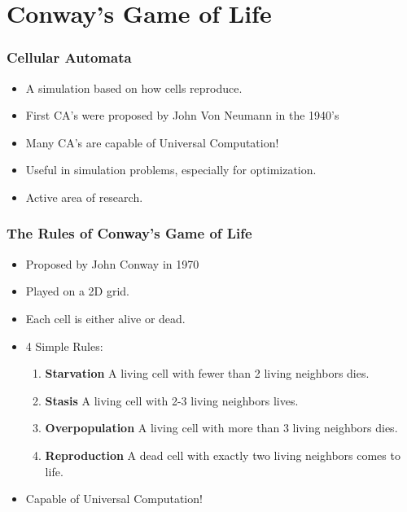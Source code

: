 \documentclass{beamer}
\begin{document}
\section{Conway's Game of Life}
\begin{frame}
    \frametitle{Cellular Automata}
    \begin{itemize}
        \item A simulation based on how cells reproduce.
        \item First CA's were proposed by John Von Neumann in the 1940's
        \item Many CA's are capable of Universal Computation!
        \item Useful in simulation problems, especially for optimization.
        \item Active area of research.
    \end{itemize}
\end{frame}

\begin{frame}
    \frametitle{The Rules of Conway's Game of Life}
    \begin{itemize}
    \item Proposed by John Conway in 1970
    \item Played on a 2D grid. 
    \item Each cell is either alive or dead.
    \item 4 Simple Rules:
    \begin{enumerate}
        \item {\bf Starvation} A living cell with fewer than 2 living         
            neighbors dies.
        \item {\bf Stasis} A living cell with 2-3 living neighbors lives.
        \item {\bf Overpopulation} A living cell with more than 3 living 
            neighbors dies.
        \item {\bf Reproduction} A dead cell with exactly two living 
           neighbors comes to life.
    \end{enumerate}
    \item Capable of Universal Computation!
    \end{itemize}
\end{frame}
\end{document}
